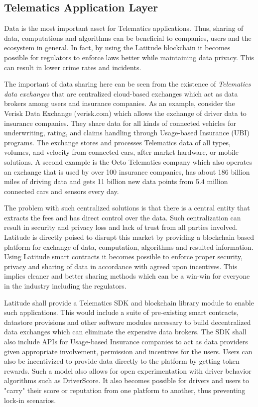 \subsection{Telematics Application Layer}

Data is the most important asset for Telematics applications. Thus, sharing of data, computations and algorithms can be
beneficial to companies, users and the ecosystem in general. In fact, by using the Latitude blockchain it becomes
possible for regulators to enforce laws better while maintaining data privacy. This can result in lower crime rates and
incidents.

The important of data sharing here can be seen from the existence of {\em Telematics data exchanges} that are
centralized cloud-based exchanges which act as data brokers among users and insurance companies. As an example, consider
the Verisk Data Exchange (verisk.com) which allows the exchange of driver data to insurance companies. They share data
for all kinds of connected vehicles for underwriting, rating, and claims handling through Usage-based Insurance (UBI)
programs.  The exchange stores and processes Telematics data of all types, volumes, and velocity from connected cars,
after-market hardware, or mobile solutions. A second example is the Octo Telematics company which also operates an
exchange that is used by over 100 insurance companies, has about 186 billion miles of driving data and gets 11 billion
new data points from 5.4 million connected cars and sensors every day.

The problem with such centralized solutions is that there is a central entity that extracts the fees and has direct
control over the data. Such centralization can result in security and privacy loss and lack of trust from all parties
involved. Latitude is directly poised to disrupt this market by providing a blockchain based platform for exchange of
data, computation, algorithms and resulted information. Using Latitude smart contracts it becomes possible to enforce
proper security, privacy and sharing of data in accordance with agreed upon incentives. This implies cleaner and better
sharing methods which can be a win-win for everyone in the industry including the regulators.

Latitude shall provide a Telematics SDK and blockchain library module to enable such applications. This would include a
suite of pre-existing smart contracts, datastore provisions and other software modules necessary to build decentralized
data exchanges which can eliminate the expensive data brokers. The SDK shall also include APIs for Usage-based Insurance
companies to act as data providers given appropriate involvement, permission and incentives for the users. Users can
also be incentivized to provide data directly to the platform by getting token rewards. Such a model also allows for
open experimentation with driver behavior algorithms such as DriverScore. It also becomes possible for drivers and users
to "carry" their score or reputation from one platform to another, thus preventing lock-in scenarios.


